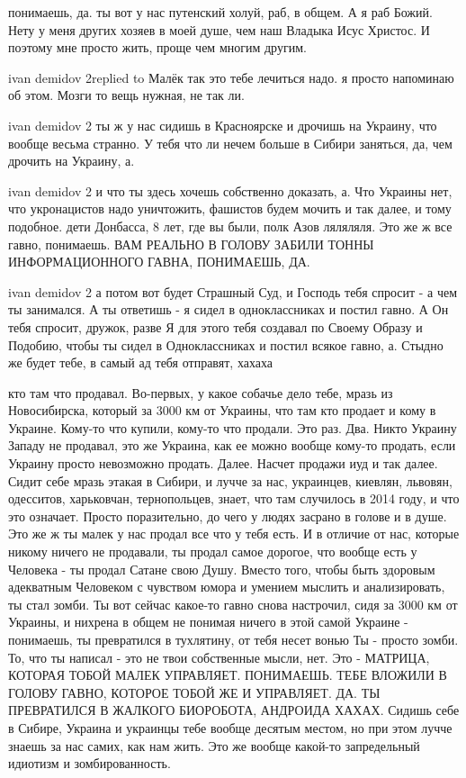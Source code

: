понимаешь, да. ты вот у нас путенский холуй, раб, в общем. А я раб Божий. Нету
у меня других хозяев в моей душе, чем наш Владыка Исус Христос. И поэтому мне
просто жить, проще чем многим другим.

ivan demidov 2replied to Малёк так это тебе лечиться надо. я просто напоминаю
об этом. Мозги то вещь нужная, не так ли.

ivan demidov 2 ты ж у нас сидишь в Красноярске и дрочишь на Украину, что вообще
весьма странно. У тебя что ли нечем больше в Сибири заняться, да, чем дрочить
на Украину, а.

ivan demidov 2 и что ты здесь хочешь собственно доказать, а. Что Украины нет,
что укронацистов надо уничтожить, фашистов будем мочить и так далее, и тому
подобное. дети Донбасса, 8 лет, где вы были, полк Азов ляляляля. Это же ж все
гавно, понимаешь. ВАМ РЕАЛЬНО В ГОЛОВУ ЗАБИЛИ ТОННЫ ИНФОРМАЦИОННОГО ГАВНА,
ПОНИМАЕШЬ, ДА.

ivan demidov 2 а потом вот будет Страшный Суд, и Господь тебя спросит - а чем
ты занимался. А ты ответишь - я сидел в одноклассниках и постил гавно. А Он
тебя спросит, дружок, разве Я для этого тебя создавал по Своему Образу и
Подобию, чтобы ты сидел в Одноклассниках и постил всякое гавно, а. Стыдно же
будет тебе, в самый ад тебя отправят, хахаха

кто там что продавал. Во-первых, у какое собачье дело тебе, мразь из
Новосибирска, который за 3000 км от Украины, что там кто продает и кому в
Украине. Кому-то что купили, кому-то что продали. Это раз. Два. Никто Украину
Западу не продавал, это же Украина, как ее можно вообще кому-то продать, если
Украину просто невозможно продать. Далее. Насчет продажи иуд и так далее. Сидит
себе мразь этакая в Сибири, и лучче за нас, украинцев, киевлян, львовян,
одесситов, харьковчан, тернопольцев, знает, что там случилось в 2014 году, и
что это означает. Просто поразительно, до чего у людях засрано в голове и в
душе. Это же ж ты малек у нас продал все что у тебя есть. И в отличие от нас,
которые никому ничего не продавали, ты продал самое дорогое, что вообще есть у
Человека - ты продал Сатане свою Душу. Вместо того, чтобы быть здоровым
адекватным Человеком с чувством юмора и умением мыслить и анализировать, ты
стал зомби. Ты вот сейчас какое-то гавно снова настрочил, сидя за 3000 км от
Украины, и нихрена в общем не понимая ничего в этой самой Украине - понимаешь,
ты превратился в тухлятину, от тебя несет вонью Ты - просто зомби. То, что ты
написал - это не твои собственные мысли, нет. Это - МАТРИЦА, КОТОРАЯ ТОБОЙ
МАЛЕК УПРАВЛЯЕТ. ПОНИМАЕШЬ. ТЕБЕ ВЛОЖИЛИ В ГОЛОВУ ГАВНО, КОТОРОЕ ТОБОЙ ЖЕ И
УПРАВЛЯЕТ. ДА. ТЫ ПРЕВРАТИЛСЯ В ЖАЛКОГО БИОРОБОТА, АНДРОИДА ХАХАХ. Сидишь себе
в Сибире, Украина и украинцы тебе вообще десятым местом, но при этом лучче
знаешь за нас самих, как нам жить. Это же вообще какой-то запредельный идиотизм
и зомбированность.

